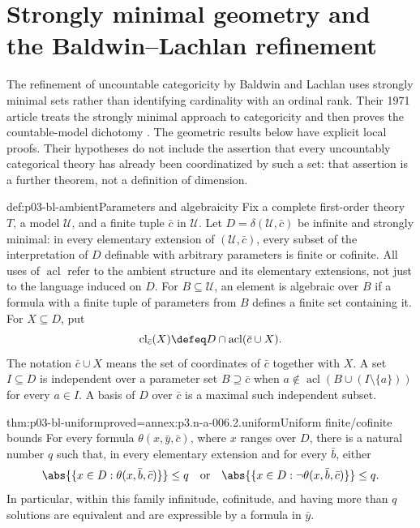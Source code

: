 \section{Strongly minimal geometry and the Baldwin--Lachlan refinement}
\label{sec:p03-n-a-006-02}

The refinement of uncountable categoricity by Baldwin and Lachlan uses
strongly minimal sets rather than identifying cardinality with an ordinal
rank. Their 1971 article treats the strongly minimal approach to categoricity
and then proves the countable-model dichotomy
\cite{BaldwinLachlan1971}. The geometric results below have explicit local
proofs. Their hypotheses do not include the assertion that every
uncountably categorical theory has already been coordinatized by such a
set: that assertion is a further theorem, not a definition of dimension.

\begin{hbconvention}{def:p03-bl-ambient}{Parameters and algebraicity}
Fix a complete first-order theory \(T\), a model \(\mathcal U\), and a finite
tuple \(\bar c\) in \(\mathcal U\). Let
\(D=\delta(\mathcal U,\bar c)\) be infinite and strongly minimal: in every
elementary extension of \((\mathcal U,\bar c)\), every subset of the
interpretation of \(D\) definable with arbitrary parameters is finite or
cofinite. All uses of \(\operatorname{acl}\) refer to the ambient structure
and its elementary extensions, not just to the language induced on \(D\).
For \(B\subseteq\mathcal U\), an element is algebraic over \(B\) if a
formula with a finite tuple of parameters from \(B\) defines a finite set
containing it. For \(X\subseteq D\), put
\[
 \operatorname{cl}_{\bar c}(X)
   \defeq D\cap\operatorname{acl}(\bar c\cup X).
\]
The notation \(\bar c\cup X\) means the set of coordinates of \(\bar c\)
together with \(X\). A set \(I\subseteq D\) is independent over a parameter
set \(B\supseteq\bar c\) when
\(a\notin\operatorname{acl}(B\cup(I\setminus\{a\}))\) for every \(a\in I\).
A basis of \(D\) over \(\bar c\) is a maximal such independent subset.
\end{hbconvention}

\begin{hblemma}{thm:p03-bl-uniform}{proved=annex:p3.n-a-006.2.uniform}{Uniform finite/cofinite bounds}
For every formula \(\theta(x,\bar y,\bar c)\), where \(x\) ranges over \(D\),
there is a natural number \(q\) such that, in every elementary extension and
for every \(\bar b\), either
\[
 \abs{\{x\in D:\theta(x,\bar b,\bar c)\}}\leq q
 \quad\text{or}\quad
 \abs{\{x\in D:\neg\theta(x,\bar b,\bar c)\}}\leq q.
\]
In particular, within this family infinitude, cofinitude, and having more
than \(q\) solutions are equivalent and are expressible by a formula in
\(\bar y\).
\end{hblemma}

